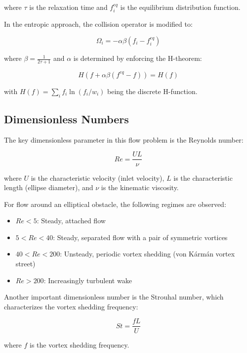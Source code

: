 \documentclass[12pt,a4paper]{article}
\begin{document}
where $\tau$ is the relaxation time and $f_i^{eq}$ is the equilibrium distribution function.

In the entropic approach, the collision operator is modified to:

\begin{equation}
\Omega_i = -\alpha\beta(f_i - f_i^{eq})
\end{equation}

where $\beta = \frac{1}{2\tau + 1}$ and $\alpha$ is determined by enforcing the H-theorem:

\begin{equation}
H(f + \alpha\beta(f^{eq} - f)) = H(f)
\end{equation}

with $H(f) = \sum_i f_i \ln(f_i/w_i)$ being the discrete H-function.

\subsection{Dimensionless Numbers}
The key dimensionless parameter in this flow problem is the Reynolds number:

\begin{equation}
Re = \frac{U L}{\nu}
\end{equation}

where $U$ is the characteristic velocity (inlet velocity), $L$ is the characteristic length (ellipse diameter), and $\nu$ is the kinematic viscosity.

For flow around an elliptical obstacle, the following regimes are observed:
\begin{itemize}
    \item $Re < 5$: Steady, attached flow
    \item $5 < Re < 40$: Steady, separated flow with a pair of symmetric vortices
    \item $40 < Re < 200$: Unsteady, periodic vortex shedding (von Kármán vortex street)
    \item $Re > 200$: Increasingly turbulent wake
\end{itemize}

Another important dimensionless number is the Strouhal number, which characterizes the vortex shedding frequency:

\begin{equation}
St = \frac{f L}{U}
\end{equation}

where $f$ is the vortex shedding frequency.
\end{document}
